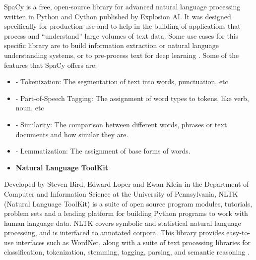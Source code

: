         
        \par SpaCy is a free, open-source library for advanced natural language processing written in Python and Cython published by Explosion AI. It was designed specifically for production use and to help in the building of applications that process and \enquote{understand} large volumes of text data.  Some use cases for this specific library are to build information extraction or natural language understanding systems, or to pre-process text for deep learning \cite{Spacy2017}. Some of the features that SpaCy offers are: 

        
        \begin{itemize}[leftmargin=1cm]  
            \renewcommand{\labelitemi}{$\textperiodcentered$}
        
            \item - Tokenization: The segmentation of text into words, punctuation, etc
            \item - Part-of-Speech Tagging: The assignment of word types to tokens, like verb, noun, etc
            \item - Similarity: The comparison between different words, phrases or text documents and how similar they are.
            \item - Lemmatization: The assignment of base forms of words.
   
            \renewcommand{\labelitemi}{$\textbullet$}
        \end{itemize}
        
        \newpage
        
        \begin{itemize}
            \item\textbf{Natural Language ToolKit}
        \end{itemize}
      
 

        \par Developed by Steven Bird, Edward Loper and Ewan Klein in the Department of Computer and Information Science at the University of Pennsylvania, NLTK (Natural Language ToolKit) is a suite of open source program modules, tutorials, problem sets and a leading platform for building Python programs to work with human language data. NLTK covers symbolic and statistical natural language processing, and is interfaced to annotated corpora. This library provides easy-to-use interfaces such as WordNet, along with a suite of text processing libraries for classification, tokenization, stemming, tagging, parsing, and semantic reasoning \cite{Loper2002}. 

